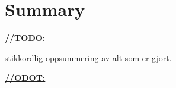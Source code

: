 \chapter{Summary}

\underline{\textbf{\LARGE //TODO:}}

stikkordlig oppsummering av alt som er gjort.

\underline{\textbf{\LARGE //ODOT:}}